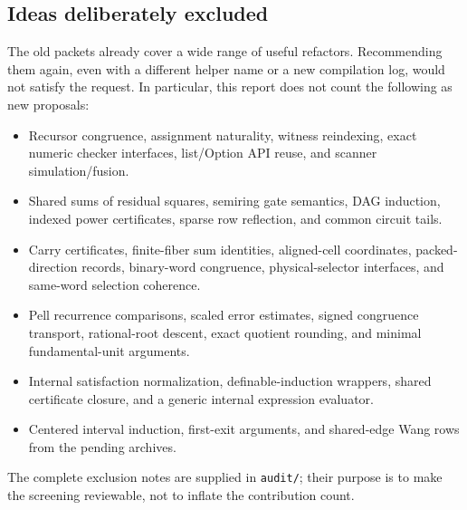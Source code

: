 \documentclass[11pt,letterpaper]{article}
\newcommand{\code}[1]{\nolinkurl{#1}}
\begin{document}
\subsection{Ideas deliberately excluded}
The old packets already cover a wide range of useful refactors. Recommending them again, even with a different helper name or a new compilation log, would not satisfy the request. In particular, this report does not count the following as new proposals:
\begin{itemize}
\item Recursor congruence, assignment naturality, witness reindexing, exact numeric checker interfaces, list/Option API reuse, and scanner simulation/fusion.
\item Shared sums of residual squares, semiring gate semantics, DAG induction, indexed power certificates, sparse row reflection, and common circuit tails.
\item Carry certificates, finite-fiber sum identities, aligned-cell coordinates, packed-direction records, binary-word congruence, physical-selector interfaces, and same-word selection coherence.
\item Pell recurrence comparisons, scaled error estimates, signed congruence transport, rational-root descent, exact quotient rounding, and minimal fundamental-unit arguments.
\item Internal satisfaction normalization, definable-induction wrappers, shared certificate closure, and a generic internal expression evaluator.
\item Centered interval induction, first-exit arguments, and shared-edge Wang rows from the pending archives.
\end{itemize}
The complete exclusion notes are supplied in \code{audit/}; their purpose is to make the screening reviewable, not to inflate the contribution count.
\end{document}
